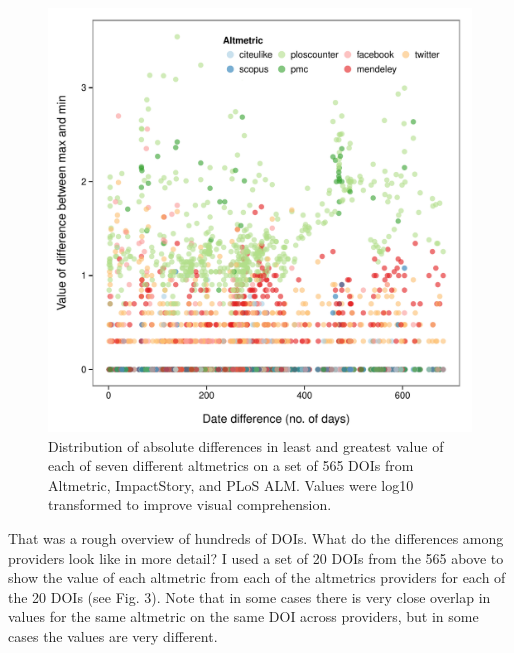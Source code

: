 \documentclass[letterpaper,superscriptaddress,showkeys,longbibliography]{revtex4-1}\usepackage{graphicx, color}
\newenvironment{knitrout}{}{} %
\begin{document}
\begin{knitrout}
\color{fgcolor}\begin{figure}[]


{\centering \includegraphics[width=.7\linewidth]{figure/dataconst_plot2} 

}

\caption[Distribution of absolute differences in least and greatest value of each of seven different altmetrics on a set of 565 DOIs from Altmetric, ImpactStory, and PLoS ALM]{Distribution of absolute differences in least and greatest value of each of seven different altmetrics on a set of 565 DOIs from Altmetric, ImpactStory, and PLoS ALM. Values were log10 transformed to improve visual comprehension.\label{fig:dataconst_plot2}}
\end{figure}


\end{knitrout}


That was a rough overview of hundreds of DOIs. What do the differences among providers look like in more detail? I used a set of 20 DOIs from the 565 above to show the value of each altmetric from each of the altmetrics providers for each of the 20 DOIs (see Fig. 3). Note that in some cases there is very close overlap in values for the same altmetric on the same DOI across providers, but in some cases the values are very different. 
\end{document}
